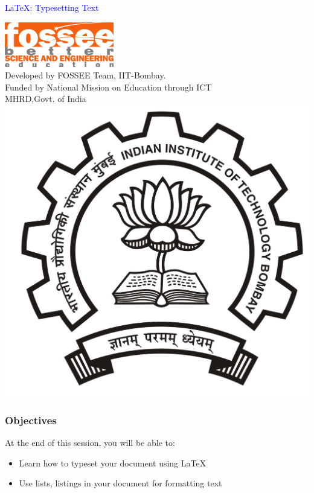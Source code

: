 \documentclass[14pt,compress]{beamer}
\begin{document}
\begin{frame}

\begin{center}
\vspace{12pt}
\textcolor{blue}{\huge {\LaTeX}: Typesetting Text}
\end{center}
\vspace{18pt}
\begin{center}
\vspace{10pt}
\includegraphics[scale=0.95]{../images/fossee-logo.png}\\
\vspace{5pt}
\scriptsize Developed by FOSSEE Team, IIT-Bombay. \\ 
\scriptsize Funded by National Mission on Education through ICT\\
\scriptsize  MHRD,Govt. of India\\
\includegraphics[scale=0.15]{../images/iitb-logo.jpg}\\
\end{center}
\end{frame}

\begin{frame}
  \frametitle{Objectives}
  At the end of this session, you will be able to:
  \begin{itemize}
  \item Learn how to typeset your document using {\LaTeX}
  \item Use lists, listings in your document for formatting text
  \end{itemize}
\end{frame}
\end{document}
